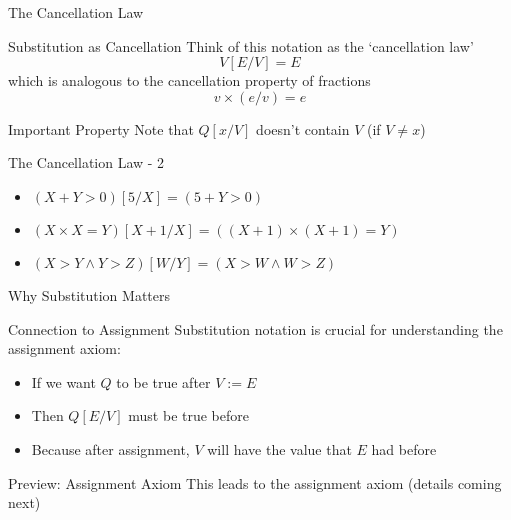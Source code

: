 \begin{frame}{The Cancellation Law}
    \begin{block}{Substitution as Cancellation}
        Think of this notation as the `cancellation law'
        \[ V[E/V] = E \]
        which is analogous to the cancellation property of fractions
        \[ v \times (e/v) = e \]
    \end{block}

    \begin{alertblock}{Important Property}
        Note that $Q[x/V]$ doesn't contain $V$ (if $V \neq x$)
    \end{alertblock}

\end{frame}

\begin{frame}{The Cancellation Law - 2}
    \begin{example}
        \begin{itemize}
            \item $(X + Y > 0)[5/X] = (5 + Y > 0)$
            \item $(X \times X = Y)[X+1/X] = ((X+1) \times (X+1) = Y)$
            \item $(X > Y \wedge Y > Z)[W/Y] = (X > W \wedge W > Z)$
        \end{itemize}
    \end{example}
\end{frame}

\begin{frame}{Why Substitution Matters}
    \begin{block}{Connection to Assignment}
        Substitution notation is crucial for understanding the assignment axiom:
        \begin{itemize}
            \item If we want $Q$ to be true after $V := E$
            \item Then $Q[E/V]$ must be true before
            \item Because after assignment, $V$ will have the value that $E$ had before
        \end{itemize}
    \end{block}

    \begin{block}{Preview: Assignment Axiom}
        This leads to the assignment axiom (details coming next)
    \end{block}
\end{frame}

